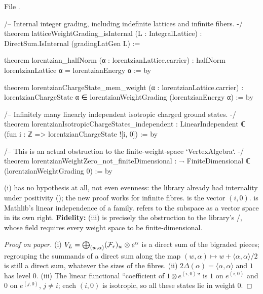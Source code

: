 \noindent File .
\begin{leancode}
/-- Internal integer grading, including indefinite lattices and infinite fibers. -/
theorem latticeWeightGrading_isInternal (L : IntegralLattice) :
    DirectSum.IsInternal (gradingLatGen L) :=

theorem lorentzian_halfNorm (α : lorentzianLattice.carrier) :
    halfNorm lorentzianLattice α = lorentzianEnergy α := by

theorem lorentzianChargeState_mem_weight (α : lorentzianLattice.carrier) :
    lorentzianChargeState α ∈ lorentzianWeightGrading (lorentzianEnergy α) := by

/-- Infinitely many linearly independent isotropic charged ground states. -/
theorem lorentzianIsotropicChargeStates_independent :
    LinearIndependent ℂ (fun i : ℤ => lorentzianChargeState ![i, 0]) := by

/-- This is an actual obstruction to the finite-weight-space `VertexAlgebra`. -/
theorem lorentzianWeightZero_not_finiteDimensional :
    ¬ FiniteDimensional ℂ (lorentzianWeightGrading 0) := by
\end{leancode}

\begin{dictionary}
(i) has no hypothesis at all, not even evenness: the library already had internality under positivity
(); the new proof works for infinite fibres.
\chseventeenL{![i, 0]} is the vector $(i,0)$.   is Mathlib's linear independence of a
family.   refers to the subspace as a vector space in
its own right.  \textbf{Fidelity:} (iii) is precisely the obstruction to the library's
/, whose field  requires every weight space
to be finite-dimensional.
\end{dictionary}

\begin{proof}[Proof on paper]
(i) $V_L=\bigoplus_{(w,\alpha)}(\mathcal{F}_r)_w\otimes e^\alpha$ is a direct sum of the bigraded pieces; regrouping
the summands of a direct sum along the map $(w,\alpha)\mapsto w+\langle\alpha,\alpha\rangle/2$ is still a direct sum,
whatever the sizes of the fibres.  (ii) $2\Delta(\alpha)=\langle\alpha,\alpha\rangle$ and $1$ has level $0$.  (iii) The
linear functional ``coefficient of $1\otimes e^{(i,0)}$'' is $1$ on $e^{(i,0)}$ and $0$ on $e^{(j,0)}$, $j\ne i$;
each $(i,0)$ is isotropic, so all these states lie in weight $0$.
\end{proof}

